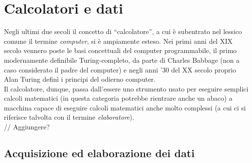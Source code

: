 
\chapter{Calcolatori e dati} %

\label{Chapter2} %


Negli ultimi due secoli il concetto di ``calcolatore'', a cui è subentrato nel
lessico comune il termine \emph{computer}, si è ampiamente esteso. Nei primi
anni del XIX secolo vennero poste le basi concettuali del computer programmabile, 
il primo modernamente definibile Turing-completo, da parte di Charles Babbage 
(non a caso considerato il padre del computer\citep{CBabbage})
e negli anni '30 del XX secolo proprio Alan Turing definì i principi del odierno computer. 
\\
Il calcolatore, dunque, passa dall'essere uno strumento usato per
eseguire semplici calcoli matematici (in questa categoria potrebbe rientrare
anche un abaco) a macchina capace di eseguire calcoli matematici anche molto 
complessi (a cui ci si riferisce talvolta con il termine \emph{elaboratore}).
\\
// Aggiungere?


\section{Acquisizione ed elaborazione dei dati}

